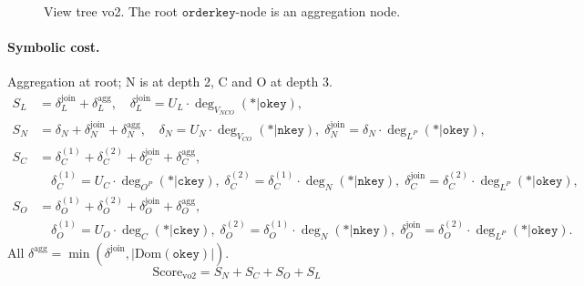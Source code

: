 \begin{figure}[ht]
\centering
{}
\caption{View tree vo2. The root $\texttt{orderkey}$-node is an aggregation node.}
\label{fig:vo2}
\end{figure}

\paragraph{Symbolic cost.}
Aggregation at root; N is at depth 2, C and O at depth 3.
\begin{align*}
S_L &= \delta^{\mathrm{join}}_L + \delta^{\mathrm{agg}}_L,
\quad \delta^{\mathrm{join}}_L = U_L \cdot \deg_{V_{NCO}}(*|\texttt{okey}),\\[4pt]
S_N &= \delta_N + \delta^{\mathrm{join}}_N + \delta^{\mathrm{agg}}_N,
\quad \delta_N = U_N \cdot \deg_{V_{CO}}(*|\texttt{nkey}),\;
\delta^{\mathrm{join}}_N = \delta_N \cdot \deg_{L^P}(*|\texttt{okey}),\\[4pt]
S_C &= \delta^{(1)}_C + \delta^{(2)}_C + \delta^{\mathrm{join}}_C + \delta^{\mathrm{agg}}_C,\\
&\quad \delta^{(1)}_C = U_C \cdot \deg_{O^P}(*|\texttt{ckey}),\;
\delta^{(2)}_C = \delta^{(1)}_C \cdot \deg_N(*|\texttt{nkey}),\;
\delta^{\mathrm{join}}_C = \delta^{(2)}_C \cdot \deg_{L^P}(*|\texttt{okey}),\\[4pt]
S_O &= \delta^{(1)}_O + \delta^{(2)}_O + \delta^{\mathrm{join}}_O + \delta^{\mathrm{agg}}_O,\\
&\quad \delta^{(1)}_O = U_O \cdot \deg_C(*|\texttt{ckey}),\;
\delta^{(2)}_O = \delta^{(1)}_O \cdot \deg_N(*|\texttt{nkey}),\;
\delta^{\mathrm{join}}_O = \delta^{(2)}_O \cdot \deg_{L^P}(*|\texttt{okey}).
\end{align*}
All $\delta^{\mathrm{agg}} = \min(\delta^{\mathrm{join}}, |\mathrm{Dom}(\texttt{okey})|)$.
\[
\boxed{\mathrm{Score}_{\mathrm{vo2}} = S_N + S_C + S_O + S_L}
\]


